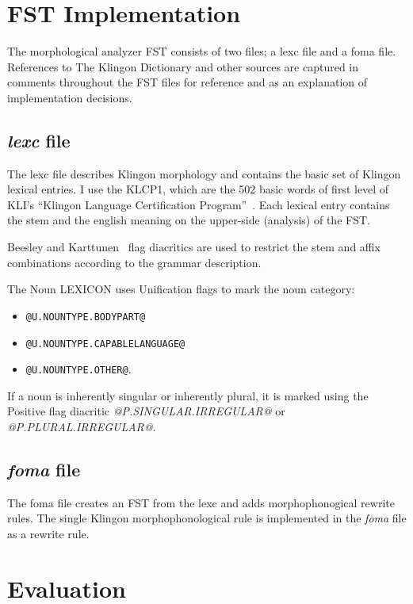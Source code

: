 \documentclass[11pt]{article}
\begin{document}
\section{FST Implementation}

The morphological analyzer FST consists of two files; a lexc file and a foma file. References to The Klingon Dictionary and other sources are captured in comments throughout the FST files for reference and as an explanation of implementation decisions.

\subsection{\textit{lexc} file}

The lexc file describes Klingon morphology and contains the basic set of Klingon lexical entries. I use the KLCP1, which are the 502 basic words of first level of KLI's ``Klingon Language Certification Program''~\cite{Zrajm:12}. Each lexical entry contains the stem and the english meaning on the upper-side (analysis) of the FST.

Beesley and Karttunen~ flag diacritics are used to restrict the stem and affix combinations according to the grammar description.

The Noun LEXICON uses Unification flags to mark the noun category:
\begin{itemize}
	\item \texttt{@U.NOUNTYPE.BODYPART@}
	\item \texttt{@U.NOUNTYPE.CAPABLELANGUAGE@}
	\item \texttt{@U.NOUNTYPE.OTHER@}.
\end{itemize}

If a noun is inherently singular or inherently plural, it is marked using the Positive flag diacritic \textit{@P.SINGULAR.IRREGULAR@} or \textit{@P.PLURAL.IRREGULAR@}.

\subsection{\textit{foma} file}

The foma file creates an FST from the lexc and adds morphophonogical rewrite rules. The single Klingon morphophonological rule is implemented in the \textit{foma} file as a rewrite rule.

\section{Evaluation}
\end{document}
